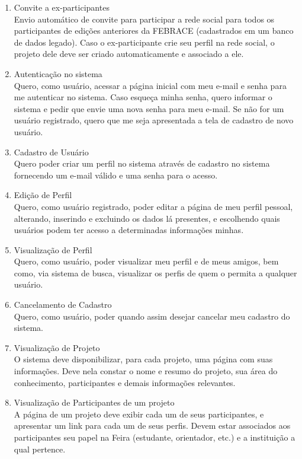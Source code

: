 \documentclass[a4paper,12pt,font=plain,header=plain]{abnt}
\begin{document}
	\begin{enumerate}
	 \item Convite a ex-participantes \\
		Envio automático de convite para participar a rede social para todos os participantes de edições anteriores da FEBRACE (cadastrados em um banco de dados legado). Caso o ex-participante crie seu perfil na rede social, o projeto dele deve ser criado automaticamente e associado a ele.
	 \item Autenticação no sistema \\
		Quero, como usuário, acessar a página inicial com meu e-mail e senha para me autenticar no sistema. Caso esqueça minha senha, quero informar o sistema e pedir que envie uma nova senha para meu e-mail. Se não for um usuário registrado, quero que me seja apresentada a tela de cadastro de novo usuário.
	 \item Cadastro de Usuário \\
		Quero poder criar um perfil no sistema através de cadastro no sistema fornecendo um e-mail válido e uma senha para o acesso.
	 \item Edição de Perfil \\
		Quero, como usuário registrado, poder editar a página de meu perfil pessoal, alterando, inserindo e excluindo os dados lá presentes, e escolhendo quais usuários podem ter acesso a determinadas informações minhas.
	 \item Visualização de Perfil \\
		Quero, como usuário, poder visualizar meu perfil e de meus amigos, bem como, via sistema de busca, visualizar os perfis de quem o permita a qualquer usuário.
	 \item Cancelamento de Cadastro \\
		Quero, como usuário, poder quando assim desejar cancelar meu cadastro do sistema.
	 \item Visualização de Projeto \\
		O sistema deve disponibilizar, para cada projeto, uma página com suas informações. Deve nela constar o nome e resumo do projeto, sua área do conhecimento, participantes e demais informações relevantes.
	 \item Visualização de Participantes de um projeto \\
		A página de um projeto deve exibir cada um de seus participantes, e apresentar um link para cada um de seus perfis. Devem estar associados aos participantes seu papel na Feira (estudante, orientador, etc.) e a instituição a qual pertence.

\end{enumerate}
\end{document}
